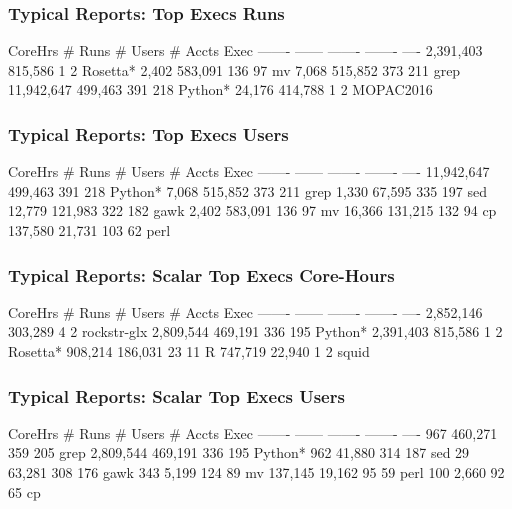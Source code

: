 \documentclass{beamer}
\begin{document}
\begin{frame}[fragile]
    \frametitle{Typical Reports: Top Execs Runs}
 {\small
    \begin{semiverbatim}
   CoreHrs   # Runs  # Users  # Accts  Exec
   -------   ------  -------  -------  ----
 2,391,403  815,586        1        2  Rosetta*
     2,402  583,091      136       97  mv
     7,068  515,852      373      211  grep
11,942,647  499,463      391      218  Python*
    24,176  414,788        1        2  MOPAC2016
    \end{semiverbatim}
}
\end{frame}

\begin{frame}[fragile]
    \frametitle{Typical Reports: Top Execs Users}
 {\small
    \begin{semiverbatim}
   CoreHrs   # Runs  # Users  # Accts  Exec
   -------   ------  -------  -------  ----
11,942,647  499,463      391      218  Python*
     7,068  515,852      373      211  grep
     1,330   67,595      335      197  sed
    12,779  121,983      322      182  gawk
     2,402  583,091      136       97  mv
    16,366  131,215      132       94  cp
   137,580   21,731      103       62  perl
    \end{semiverbatim}
}
\end{frame}

\begin{frame}[fragile]
    \frametitle{Typical Reports: Scalar Top Execs Core-Hours}
 {\small
    \begin{semiverbatim}
  CoreHrs   # Runs  # Users  # Accts  Exec
  -------   ------  -------  -------  ----
2,852,146  303,289        4        2  rockstr-glx
2,809,544  469,191      336      195  Python*
2,391,403  815,586        1        2  Rosetta*
  908,214  186,031       23       11  R
  747,719   22,940        1        2  squid
    \end{semiverbatim}
}
\end{frame}

\begin{frame}[fragile]
    \frametitle{Typical Reports: Scalar Top Execs Users}
 {\small
    \begin{semiverbatim}
  CoreHrs   # Runs  # Users  # Accts  Exec
  -------   ------  -------  -------  ----
      967  460,271      359      205  grep
2,809,544  469,191      336      195  Python*
      962   41,880      314      187  sed
       29   63,281      308      176  gawk
      343    5,199      124       89  mv
  137,145   19,162       95       59  perl
      100    2,660       92       65  cp
    \end{semiverbatim}
}
\end{frame}
\end{document}
